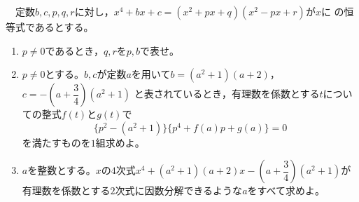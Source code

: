 \documentclass{ltjsarticle}
\begin{document}
%
　定数$b,c,p,q,r$に対し，$x^4+bx+c=(x^2+px+q)(x^2-px+r)$が$x$に
の恒等式であるとする。
\begin{enumerate}
\item[(1)]\quad$p\ne{0}$であるとき，$q,r$を$p,b$で表せ。
\item[(2)]\quad$p\ne{0}$とする。$b,c$が定数$a$を用いて$b=(a^2+1)(a+2)$，$c=-\left(a+\dfrac{3}{4}\right)(a^2+1)$
と表されているとき，有理数を係数とする$t$についての整式$f(t)$と$g(t)$で
\[\{p^2-(a^2+1)\}\{p^4+f(a)p+g(a)\}=0\]
を満たすものを$1$組求めよ。
\item[(3)]\quad$a$を整数とする。$x$の$4$次式$x^4+(a^2+1)(a+2)x-\left(a+\dfrac{3}{4}\right)(a^2+1)$が有理数を係数とする$2$次式に因数分解できるような$a$をすべて求めよ。
\end{enumerate}
%
\end{document}
